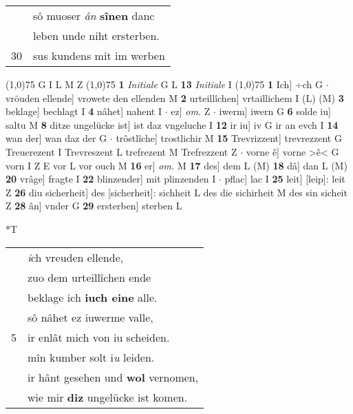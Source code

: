 \documentclass[8pt,a4paper,notitlepage]{article}
\begin{document}
\begin{table}[ht]
\begin{minipage}[t]{0.5\linewidth}
\begin{tabular}{rl}
 & sô muoser \textit{ân} \textbf{sînen} danc\\ 
 & leben unde niht ersterben.\\ 
30 & sus kundens mit im werben\\ 
\end{tabular}
\scriptsize
\line(1,0){75} \newline
G I L M Z \newline
\line(1,0){75} \newline
\textbf{1} \textit{Initiale} G L  \textbf{13} \textit{Initiale} I  \newline
\line(1,0){75} \newline
\textbf{1} Ich] ÷ch G  $\cdot$ vröuden ellende] vrowete den ellenden M \textbf{2} urteillîchen] vrtaillichem I (L) (M) \textbf{3} beklage] bechlagt I \textbf{4} nâhet] nahent I  $\cdot$ ez] \textit{om.} Z  $\cdot$ iwerm] iwern G \textbf{6} solde iu] saltu M \textbf{8} ditze ungelücke ist] ist daz vngeluche I \textbf{12} ir iu] iv G ir an evch I \textbf{14} wan der] wan daz der G  $\cdot$ trôstlîche] trostlichir M \textbf{15} Trevrizzent] trevrezzent G Treuerezent I Trevreszent L trefrezent M Trefrezzent Z  $\cdot$ vorne ê] vorne >ê< G vorn I Z E vor L vor ouch M \textbf{16} er] \textit{om.} M \textbf{17} des] dem L (M) \textbf{18} dâ] dan L (M) \textbf{20} vrâge] fragte I \textbf{22} blinzender] mit plinzenden I  $\cdot$ pflac] lac I \textbf{25} leit] [leip]: leit Z \textbf{26} diu sicherheit] des [sicherheit]: sichheit L des die sichirheit M des sin sicheit Z \textbf{28} ân] vnder G \textbf{29} ersterben] sterben L \newline
\end{minipage}
\hspace{0.5cm}
\begin{minipage}[t]{0.5\linewidth}
\small
\begin{center}*T
\end{center}
\begin{tabular}{rl}
 & \textit{i}ch vreuden ellende,\\ 
 & zuo dem urteillîchen ende\\ 
 & beklage ich \textbf{iuch eine} alle.\\ 
 & sô nâhet ez iuwerme valle,\\ 
5 & ir enlât mich von iu scheiden.\\ 
 & mîn kumber solt i\textit{u} leiden.\\ 
 & ir hânt gesehen und \textbf{wol} vernomen,\\ 
 & wie mir \textbf{diz} ungelücke ist komen.\\ 

\end{tabular}
\end{minipage}
\end{table}
\end{document}
